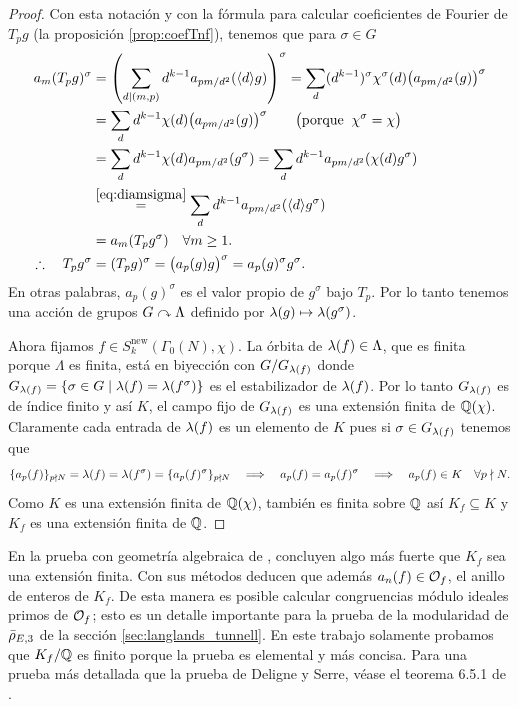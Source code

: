 \begin{proof}
  Con esta notaci\'on y con la f\'ormula para calcular coeficientes de Fourier de $T_pg$
  (la proposici\'on \ref{prop:coefTnf}), tenemos que para $\sigma\in G$
  \begin{align*}
    a_m(T_pg)^{\sigma}&=\left( \sum_{d\mid (m,p)}d^{k-1}a_{pm/d^2}(\langle d \rangle g) \right)^{\sigma}
                      =\sum_d(d^{k-1})^{\sigma}\chi^{\sigma}(d)\big(a_{pm/d^2}(g)\big)^{\sigma}\\
                      &=\sum_dd^{k-1}\chi(d)\big(a_{pm/d^2}(g)\big)^{\sigma}
                        \qquad\big(\text{porque}\;\;\chi^{\sigma}=\chi\big)\\
                      &=\sum_dd^{k-1}\chi(d)a_{pm/d^2}(g^{\sigma})
                      =\sum_dd^{k-1}a_{pm/d^2}(\chi(d)g^{\sigma})\\
                      &\overset{\eqref{eq:diamsigma}}{=}\sum_dd^{k-1}a_{pm/d^2}(\langle d \rangle g^{\sigma})\\
                      &=a_m(T_pg^{\sigma}) \quad\forall m\geq1.\\
    \therefore\quad T_pg^{\sigma}&=(T_pg)^{\sigma}=\big(a_p(g)g\big)^{\sigma}=a_p(g)^{\sigma}g^{\sigma}.
  \end{align*}
  En otras palabras, $a_p(g)^{\sigma}$ es el valor propio de $g^{\sigma}$ bajo $T_p$. Por lo tanto tenemos
  una acci\'on de grupos $G\curvearrowright \Lambda$ definido por $\lambda(g)\mapsto\lambda(g^{\sigma})$.

  Ahora fijamos $f\in S_k^{\mathrm{new}}(\Gamma_0(N),\chi)$. La \'orbita de $\lambda(f)\in\Lambda$, que
  es finita porque $\Lambda$ es finita, est\'a en biyecci\'on con $G/G_{\lambda(f)}$ donde
  $G_{\lambda(f)}=\{\sigma\in G\mid \lambda(f)=\lambda(f^{\sigma})\}$ es el estabilizador de $\lambda(f)$. Por lo tanto
  $G_{\lambda(f)}$ es de \'indice finito y as\'i $K$, el campo fijo de $G_{\lambda(f)}$ es una extensi\'on
  finita de $\mathbb{Q}(\chi)$. Claramente cada entrada de $\lambda(f)$ es un elemento de $K$ pues si $\sigma\in G_{\lambda(f)}$
  tenemos que
  \[
    \{a_p(f)\}_{p\nmid N}=\lambda(f)=\lambda(f^{\sigma})=\{a_p(f)^{\sigma}\}_{p\nmid N}\quad\Longrightarrow\quad a_p(f)=a_p(f)^{\sigma}
    \quad\Longrightarrow\quad a_p(f)\in K\quad\forall p\nmid N.
  \]
  Como $K$ es una extensi\'on finita de $\mathbb{Q}(\chi)$, tambi\'en es finita sobre $\mathbb{Q}$  as\'i
  $K_f\subseteq K$ y $K_f$ es una extensi\'on finita de $\mathbb{Q}$.
\end{proof}

\begin{nota}
  En la prueba con geometr\'ia algebraica de \cite{DeligneSerreFMDP1}, concluyen algo m\'as fuerte que $K_f$ sea una extensi\'on finita. Con sus m\'etodos deducen que adem\'as $a_n(f)\in\mathcal{O}_f$, el anillo de enteros de $K_f$. De esta manera es posible calcular congruencias m\'odulo ideales primos de $\mathcal{O}_f$; esto es un detalle importante para la prueba de la modularidad de $\bar{\rho}_{E,3}$ de la secci\'on \ref{sec:langlands_tunnell}.  En este trabajo solamente probamos que $K_f/\mathbb{Q}$ es finito porque la prueba es elemental y m\'as concisa. Para una prueba m\'as detallada que la prueba de Deligne y Serre, v\'ease el teorema 6.5.1 de \cite{DiamondShurmanAFCIMF}.
\end{nota}

